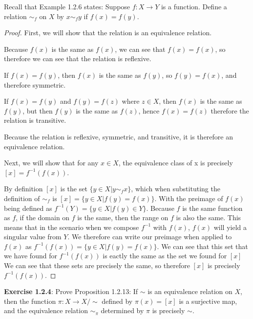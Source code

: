 \documentclass[a4paper]{article}
\begin{document}
\begin{myparindent}{0pt}
Recall that Example 1.2.6 states: Suppose $f : X \rightarrow Y$ is a function.
Define a relation $\sim_f$ on $X$ by $x \sim_f y$ if $f(x) = f(y)$.

\begin{proof}
    First, we will show that the relation is an equivalence relation. \newline

    Because $f(x)$ is the same as $f(x)$, we can see that $f(x) = f(x)$,
    so therefore we can see that the relation is reflexive. \newline

    If $f(x) = f(y)$, then $f(x)$ is the same as $f(y)$, so $f(y) = f(x)$,
    and therefore symmetric. \newline

    If $f(x) = f(y)$ and $f(y) = f(z)$ where $z \in X$, then $f(x)$ is
    the same as $f(y)$, but then $f(y)$ is the same as $f(z)$, hence $f(x) = f(z)$
    therefore the relation is transitive. \newline

    Because the relation is reflexive, symmetric, and transitive, it
    is therefore an equivalence relation. \newline

    Next, we will show that for any $x \in X$, the equivalence class of x is
    precisely $[x] = f^{-1}(f(x))$. \newline

    By definition $[x]$ is the set $\{y \in X | y \sim_f x\}$, which when substituting
    the definition of $\sim_f$ is $[x] = \{y \in X | f(y) = f(x)\}$. With the preimage
    of $f(x)$ being defined as $f^{-1}(Y) = \{ y \in X | f(y) \in Y \}$.
    Because $f$ is the same function as $f$, if the domain on $f$ is the same,
    then the range on $f$ is also the same. This means that in the scenario
    when we compose $f^{-1}$ with $f(x)$, $f(x)$ will yield
    a singular value from $Y$. We therefore can write our preimage when applied
    to $f(x)$ as $f^{-1}(f(x)) = \{ y \in X | f(y) = f(x) \}$. We can see
    that this set that we have found for $f^{-1}(f(x))$ is eactly the same
    as the set we found for $[x]$
    We can see that these sets are precisely the same, so therefore $[x]$ is
    precisely $f^{-1}(f(x))$.
\end{proof}

\textbf{Exercise 1.2.4}:
Prove Proposition 1.2.13: If $\sim$ is an equivalence relation on $X$, then the function $\pi: X \rightarrow X/\sim$
defined by $\pi(x) = [x]$ is a surjective map, and the equivalence relation $\sim_{\pi}$ determined by $\pi$ is
precisely $\sim$. \newline


\end{myparindent}
\end{document}
